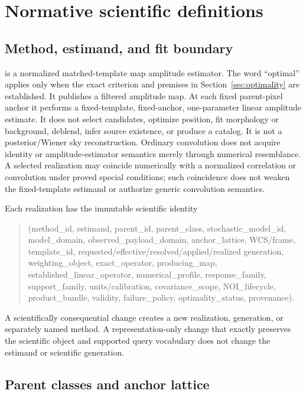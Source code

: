 \section{Normative scientific definitions}
\label{sec:definitions}

\subsection{Method, estimand, and fit boundary}

\ContractID{} is a normalized matched-template map amplitude estimator. The
word ``optimal'' applies only when the exact criterion and premises in
Section~\ref{sec:optimality} are established. It publishes
a filtered amplitude map. At each fixed parent-pixel anchor it performs a
fixed-template, fixed-anchor, one-parameter linear amplitude estimate. It does
not select candidates, optimize position, fit morphology or background,
deblend, infer source existence, or produce a catalog. It is not a
posterior/Wiener sky reconstruction. Ordinary convolution does not acquire
\ContractID{} identity or amplitude-estimator semantics merely through
numerical resemblance. A selected realization may coincide numerically with a
normalized correlation or convolution under proved special conditions; such
coincidence does not weaken the fixed-template estimand or authorize generic
convolution semantics.

Each realization has the immutable scientific identity
\begin{quote}\small\ttfamily\raggedright
(method\_id, estimand, parent\_id, parent\_class, stochastic\_model\_id,
model\_domain, observed\_payload\_domain, anchor\_lattice,
WCS/frame, template\_id, requested/effective/resolved/applied/realized
generation, weighting\_object, exact\_operator, producing\_map,
established\_linear\_operator,
numerical\_profile, response\_family, support\_family, units/calibration,
covariance\_scope, NOI\_lifecycle, product\_bundle, validity,
failure\_policy, optimality\_status, provenance).
\end{quote}
A scientifically consequential change creates a new realization, generation,
or separately named method. A representation-only change that exactly
preserves the scientific object and supported query vocabulary does not change
the estimand or scientific generation.

\subsection{Parent classes and anchor lattice}

